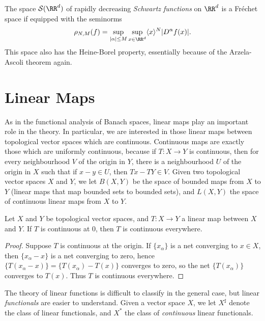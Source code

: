 \begin{example}
    The space $\mathcal{S}(\RR^d)$ of rapidly decreasing \emph{Schwartz functions} on $\RR^d$ is a Fr\'{e}chet space if equipped with the seminorms
    \[ \rho_{N,M}(f) = \sup_{|\alpha| \leq M} \sup_{x \in \RR^d} \langle x \rangle^N |D^\alpha f(x)|. \]
    This space also has the Heine-Borel property, essentially because of the Arzela-Ascoli theorem again.
\end{example}




\section{Linear Maps}

As in the functional analysis of Banach spaces, linear maps play an important role in the theory. In particular, we are interested in those linear maps between topological vector spaces which are continuous. Continuous maps are exactly those which are uniformly continuous, because if $T: X \to Y$ is continuous, then for every neighbourhood $V$ of the origin in $Y$, there is a neighbourhood $U$ of the origin in $X$ such that if $x - y \in U$, then $Tx - TY \in V$. Given two topological vector spaces $X$ and $Y$, we let $B(X,Y)$ be the space of bounded maps from $X$ to $Y$ (linear maps that map bounded sets to bounded sets), and $L(X,Y)$ the space of continuous linear maps from $X$ to $Y$.

\begin{lemma}
    Let $X$ and $Y$ be topological vector spaces, and $T: X \to Y$ a linear map between $X$ and $Y$.  If $T$ is continuous at $0$, then $T$ is continuous everywhere.
\end{lemma}
\begin{proof}
    Suppose $T$ is continuous at the origin. If $\{ x_\alpha \}$ is a net converging to $x \in X$, then $\{ x_\alpha - x \}$ is a net converging to zero, hence $\{ T(x_\alpha - x) \} = \{ T(x_\alpha) - T(x) \}$ converges to zero, so the net $\{ T(x_\alpha) \}$ converges to $T(x)$. Thus $T$ is continuous everywhere.
\end{proof}

The theory of linear functions is difficult to classify in the general case, but linear {\it functionals} are easier to understand. Given a vector space $X$, we let $X^\sharp$ denote the class of linear functionals, and $X^*$ the class of {\it continuous} linear functionals.

